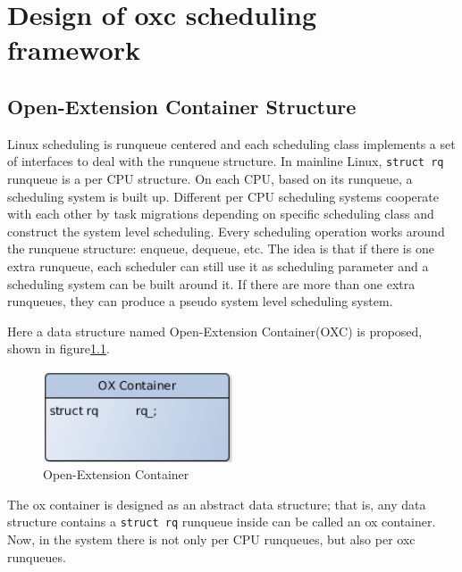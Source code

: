 \chapter{Design of oxc scheduling framework\label{chap:design}}

\section{Open-Extension Container Structure\label{sec:design_oxc}}


Linux scheduling is runqueue centered and each scheduling class 
implements a set of interfaces to deal with the runqueue structure.
In mainline Linux, \texttt{struct rq} runqueue is a per CPU structure.
On each CPU, based on its runqueue, a scheduling system is built up.
Different per CPU scheduling systems cooperate
with each other by task migrations depending on specific scheduling class 
and construct the system level scheduling. 
Every scheduling operation works around the runqueue structure: enqueue,
dequeue, etc. 
The idea is that if there is one extra runqueue, each scheduler can still 
use it as scheduling parameter and a scheduling system can be built around 
it. If there are more than one extra runqueues, they can produce a pseudo 
system level scheduling system.   

Here a data structure named Open-Extension Container(OXC) is proposed,
shown in figure\ref{fig:oxc}.
\begin{figure}[htbp]
        \centering
        \includegraphics[width=0.5\textwidth]{images/oxc}
        \caption{Open-Extension Container}
        \label{fig:oxc}
\end{figure}
The ox container is designed as an abstract data structure; that is, any data
structure contains a \texttt{struct rq} runqueue inside can be called an ox
container. Now, in the system there is not only per CPU runqueues, but also 
per oxc runqueues.

